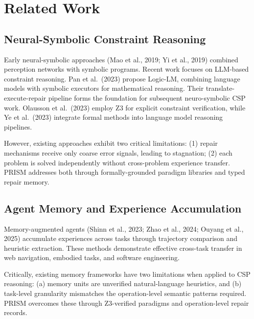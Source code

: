 
\section{Related Work}

\subsection{Neural-Symbolic Constraint Reasoning}

Early neural-symbolic approaches (Mao et al., 2019; Yi et al., 2019) combined perception networks with symbolic programs. Recent work focuses on LLM-based constraint reasoning. Pan et al.~(2023) propose Logic-LM, combining language models with symbolic executors for mathematical reasoning. Their translate-execute-repair pipeline forms the foundation for subsequent neuro-symbolic CSP work. Olausson et al.~(2023) employ Z3 for explicit constraint verification, while Ye et al.~(2023) integrate formal methods into language model reasoning pipelines.

However, existing approaches exhibit two critical limitations: (1) repair mechanisms receive only coarse error signals, leading to stagnation; (2) each problem is solved independently without cross-problem experience transfer. PRISM addresses both through formally-grounded paradigm libraries and typed repair memory.

\subsection{Agent Memory and Experience Accumulation}

Memory-augmented agents (Shinn et al., 2023; Zhao et al., 2024; Ouyang et al., 2025) accumulate experiences across tasks through trajectory comparison and heuristic extraction. These methods demonstrate effective cross-task transfer in web navigation, embodied tasks, and software engineering.

Critically, existing memory frameworks have two limitations when applied to CSP reasoning: (a) memory units are unverified natural-language heuristics, and (b) task-level granularity mismatches the operation-level semantic patterns required. PRISM overcomes these through Z3-verified paradigms and operation-level repair records.

